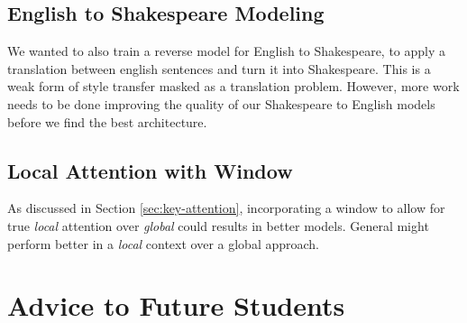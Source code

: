 \documentclass[twoside,twocolumn]{article}
\begin{document}
\subsection{English to Shakespeare Modeling}
We wanted to also train a reverse model for English to Shakespeare, to apply
a translation between english sentences and turn it into Shakespeare. This
is a weak form of style transfer masked as a translation problem. However, more
work needs to be done improving the quality of our Shakespeare to English models
before we find the best architecture.
\subsection{Local Attention with Window}
As discussed in Section \ref{sec:key-attention}, incorporating a window to allow
for true \emph{local} attention over \emph{global} could results in better
models. General might perform better in a \emph{local} context over a global
approach.
\section{Advice to Future Students}
\label{sec:advice}





\end{document}
